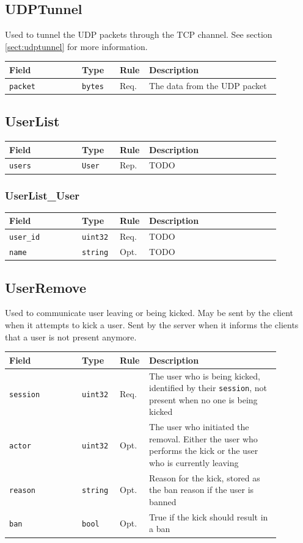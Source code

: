\documentclass[11pt]{article} %
\newenvironment{mumbleMessageEx}
{%
	\small
	\renewcommand\arraystretch{1.5}
	\begin{tabular}{p{0.25\linewidth}p{0.13\linewidth}p{0.05\linewidth}p{0.45\linewidth}}
	Field & Type & Rule & Description \\
	\hline
}
{%
	\end{tabular}
	\renewcommand\arraystretch{1.0}
}
\newcommand{\mumbleMessageExItem}[4]{ \texttt{#1} & \texttt{#2} & #3 & #4 \\ }
\begin{document}
\subsection{UDPTunnel}
\label{msg:udpTunnel}

Used to tunnel the UDP packets through the TCP channel. See section \ref{sect:udptunnel} for more information.

\begin{mumbleMessageEx}
\mumbleMessageExItem{packet}{bytes}{Req.}{The data from the UDP packet}
\end{mumbleMessageEx}

\subsection{UserList}
\label{msg:userList}

\begin{mumbleMessageEx}
\mumbleMessageExItem{users}{User}{Rep.}{TODO}
\end{mumbleMessageEx}

\subsubsection{UserList\_User}
\label{msg:userList:user}

\begin{mumbleMessageEx}
\mumbleMessageExItem{user\_id}{uint32}{Req.}{TODO}
\mumbleMessageExItem{name}{string}{Opt.}{TODO}
\end{mumbleMessageEx}

\subsection{UserRemove}
\label{msg:userRemove}

Used to communicate user leaving or being kicked. May be sent by the client when it attempts to kick a user. Sent by the server when it informs the clients that a user is not present anymore.

\begin{mumbleMessageEx}
\mumbleMessageExItem{session}{uint32}{Req.}{The user who is being kicked, identified by their \texttt{session}, not present when no one is being kicked}
\mumbleMessageExItem{actor}{uint32}{Opt.}{The user who initiated the removal. Either the user who performs the kick or the user who is currently leaving}
\mumbleMessageExItem{reason}{string}{Opt.}{Reason for the kick, stored as the ban reason if the user is banned}
\mumbleMessageExItem{ban}{bool}{Opt.}{True if the kick should result in a ban}
\end{mumbleMessageEx}
\end{document}
